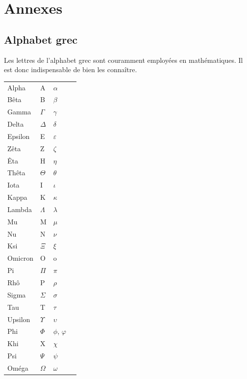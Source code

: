 \documentclass[11pt,a4paper,oneside]{book}
\theoremstyle{definition}
\theoremstyle{plain}
\begin{document}


\appendix
\chapter{Annexes}

\newpage
\section{Alphabet grec}

\noindent Les lettres de l'alphabet grec sont couramment employées en mathématiques. Il est donc indispensable de bien les connaître.

\begin{center}

\def\arraystretch{1.2}
\setlength\tabcolsep{20pt}
\begin{tabular}{llll}
Alpha		& A 			& $\alpha$\\
Bêta			& B 			& $\beta$\\
Gamma		& $\Gamma$ 	& $\gamma$\\
Delta		& $\Delta$ 	& $\delta$\\
Epsilon		& E 			& $\varepsilon$\\
Zêta			& Z 			& $\zeta$\\
Êta			& H 			& $\eta$\\
Thêta		& $\Theta$ 	& $\theta$\\
Iota			& I 			& $\iota$\\
Kappa		& K 			& $\kappa$\\
Lambda		& $\Lambda$ 	& $\lambda$\\
Mu			& M 			& $\mu$\\
Nu			& N 			& $\nu$\\
Ksi			& $\Xi$ 		& $\xi$\\
Omicron		& O 			& o\\
Pi			& $\Pi$ 		& $\pi$\\
Rhô			& P 			& $\rho$\\
Sigma		& $\Sigma$ 	& $\sigma$\\
Tau			& T 			& $\tau$\\
Upsilon		& $\Upsilon$& $\upsilon$\\
Phi			& $\Phi$ 	& $\phi$, $\varphi$\\
Khi			& X 			& $\chi$\\
Psi			& $\Psi$ 	& $\psi$ \\
Oméga		& $\Omega$ 	& $\omega$\\
\end{tabular}
\end{center}
\end{document}
